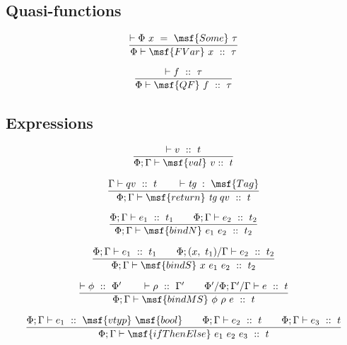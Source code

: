 \documentclass{article}
\begin{document}
\subsection{Quasi-functions}


\begin{gather}
\frac{ \vdash \Phi \ x \ = \ \msf{Some} \ \tau}{\Phi \vdash \msf{FVar}
  \ x \ :: \ \tau}
\end{gather}

\begin{gather}
\frac{ \vdash f \ :: \ \tau}{ \Phi \vdash \msf{QF} \ f \ :: \ \tau}
\end{gather}



\subsection{Expressions}

\begin{gather}
\frac{ \vdash v \ :: \ t}{\Phi; \Gamma \vdash \msf{val} \ v :: \ t}
\end{gather}

\begin{gather}
  \frac{ \Gamma \vdash qv \ :: \ t \qquad \vdash \mbox{\it tg} \ :
    \ \msf{Tag} } {\Phi; \Gamma \vdash \msf{return} \ \mbox{\it tg}
    \ qv \ :: \ t}
\end{gather}

\begin{gather}
 \frac{\Phi; \Gamma \vdash e_1 \ :: \ t_1 \qquad \Phi; \Gamma \vdash
   e_2 \ :: \ t_2} {\Phi; \Gamma \vdash \msf{bindN} \ e_1 \ e_2 \ ::
   \ t_2 }
\end{gather}

\begin{gather}
 \frac{\Phi; \Gamma \vdash e_1 \ :: \ t_1 \qquad \Phi; (x, \ t_1) /
   \Gamma \vdash e_2 \ :: \ t_2} {\Phi; \Gamma \vdash \msf{bindS} \ x
   \ e_1 \ e_2 \ :: \ t_2 }
\end{gather}

\begin{gather}
  \frac{ \vdash \phi \ :: \ \Phi' \qquad \vdash \rho \ :: \ \Gamma'
    \qquad \Phi' / \Phi; \Gamma' / \Gamma \vdash e \ :: \ t} {\Phi;
    \Gamma \vdash \msf{bindMS} \ \phi \ \rho \ e \ :: \ t }
\end{gather}

\begin{gather}
  \frac{\Phi; \Gamma \vdash e_1 \ :: \ \msf{vtyp} \ \msf{bool} \qquad
    \Phi; \Gamma \vdash e_2 \ :: \ t \qquad \Phi; \Gamma \vdash e_3
    \ :: \ t } {\Phi; \Gamma \vdash \msf{ifThenElse} \ e_1 \ e_2 \ e_3
    \ :: \ t }
\end{gather}
\end{document}
